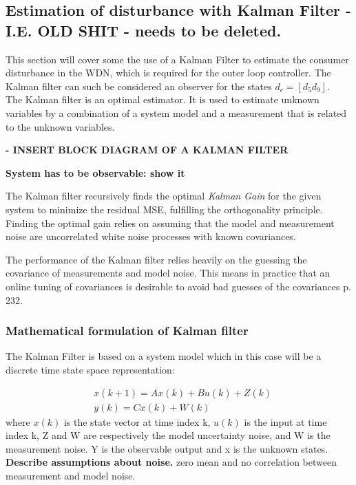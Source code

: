 \clearpage \newpage
\subsection{Estimation of disturbance with Kalman Filter - I.E. OLD SHIT - needs to be deleted.}
This section will cover some the use of a Kalman Filter to estimate the consumer disturbance in the WDN, which is required for the outer loop controller. The Kalman filter can such be considered an observer for the states $d_c = [d_5 d_9]$. \\
The Kalman filter is an optimal estimator. It is used to estimate unknown variables by a combination of a system model and a measurement that is related to the unknown variables. 

\textbf{- INSERT BLOCK DIAGRAM OF A KALMAN FILTER }

\textbf{System has to be observable: show it}

The Kalman filter recursively finds the optimal \textit{Kalman Gain} for the given system to minimize the residual MSE, fulfilling the orthogonality principle. Finding the optimal gain relies on assuming that the model and measurement noise are uncorrelated white noise processes with known covariances. 

The performance of the Kalman filter relies heavily on the guessing the covariance of measurements and model noise. This means in practice that an online tuning of covariances is desirable to avoid bad guesses of the covariances \cite{Doraiswami2014} p. 232.


\subsubsection{Mathematical formulation of Kalman filter}
The Kalman Filter is based on a system model which in this case will be a discrete time state space representation: 

\begin{align}
	&x(k+1) = Ax(k) + Bu(k) + Z(k)  \label{eq:KalmanSystemEquations} \\
	&y(k) = Cx(k)+W(k)
\end{align}
where $x(k)$ is the state vector at time index k, $u(k)$ is the input at time index k, 
Z and W are respectively the model uncertainty noise, and W is the measurement noise. Y is the observable output and x is the unknown states. \\
\textbf{Describe assumptions about noise. } zero mean and no correlation between measurement and model noise.\\

